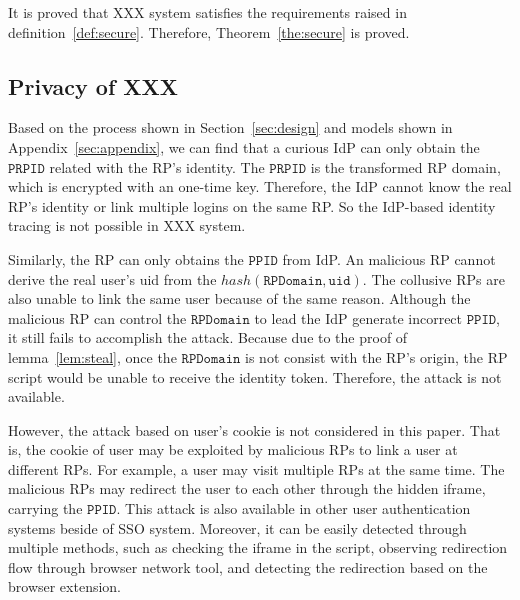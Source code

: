 It is proved that XXX system satisfies the requirements raised in definition~\ref{def:secure}. Therefore, Theorem~\ref{the:secure} is proved.


\subsection{Privacy of XXX}
Based on the process shown in Section~\ref{sec:design} and models shown in Appendix~\ref{sec:appendix}, we can find that a curious IdP can only obtain the $\mathtt{PRPID}$ related with the RP's identity. The $\mathtt{PRPID}$ is the transformed RP domain, which is encrypted with an one-time key. Therefore, the IdP cannot know the real RP's identity or link multiple logins on the same RP. So the IdP-based identity tracing is not possible in XXX system. 

Similarly, the RP can only obtains the $\mathtt{PPID}$ from IdP. An malicious RP cannot derive the real user's uid from the $hash(\mathtt{RPDomain}, \mathtt{uid})$. The collusive RPs are also unable to link the same user because of the same reason. Although the malicious RP can control the $\mathtt{RPDomain}$ to lead the IdP generate incorrect $\mathtt{PPID}$, it still fails to accomplish the attack. Because due to the proof of lemma~\ref{lem:steal}, once the $\mathtt{RPDomain}$ is not consist with the RP's origin, the RP script would be unable to receive the identity token. Therefore, the attack is not available. 

However, the attack based on user's cookie is not considered in this paper. That is, the cookie of user may be exploited by malicious RPs to link a user at different RPs. For example, a user may visit multiple RPs at the same time. The malicious RPs may redirect the user to each other through the hidden iframe, carrying the $\mathtt{PPID}$. This attack is also available in other user authentication systems beside of SSO system. Moreover, it can be easily detected through multiple methods, such as checking the iframe in the script, observing redirection flow through browser network tool, and detecting the redirection based on the browser extension.




